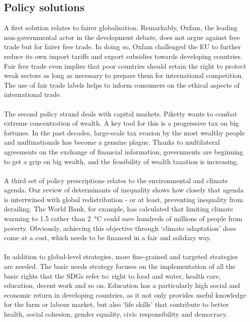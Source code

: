 \documentclass[../summary.tex]{subfiles}
\begin{document}
\subsection{Policy solutions}
A first solution relates to fairer globalisation. Remarkably, Oxfam, the leading non-governmental actor in the development debate, does not argue against free trade but for fairer free trade. In doing so, Oxfam challenged the EU to further reduce its own import tariffs and export subsidies towards developing countries. Fair free trade even implies that poor countries should retain the right to protect weak sectors as long as necessary to prepare them for international competition. The use of fair trade labels helps to inform consumers on the ethical aspects of international trade.
\\\\
The second policy strand deals with capital markets. Piketty wants to combat extreme concentration of wealth. A key tool for this is a progressive tax on big fortunes. In the past decades, large-scale tax evasion by the most wealthy people and multinationals has become a genuine plague. Thanks to multilateral agreements on the exchange of financial information, governments are beginning to get a grip on big wealth, and the feasibility of wealth taxation is increasing.
\\\\
A third set of policy prescriptions relates to the environmental and climate agenda. Our review of determinants of inequality shows how closely that agenda is intertwined with global redistribution - or at least, preventing inequality from derailing. The World Bank, for example, has calculated that limiting climate warming to 1.5 rather than \SI{2}{\degreeCelsius} could save hundreds of millions of people from poverty. Obviously, achieving this objective through `climate adaptation' does come at a cost, which needs to be financed in a fair and solidary way.
\\\\
In addition to global-level strategies, more fine-grained and targeted strategies are needed. The basic needs strategy focuses on the implementation of all the basic rights that the SDGs refer to: right to food and water, health care, education, decent work and so on. Education has a particularly high social and economic return in developing countries, as it not only provides useful knowledge for the farm or labour market, but also `life skills' that contribute to better health, social cohesion, gender equality, civic responsibility and democracy.
\end{document}
